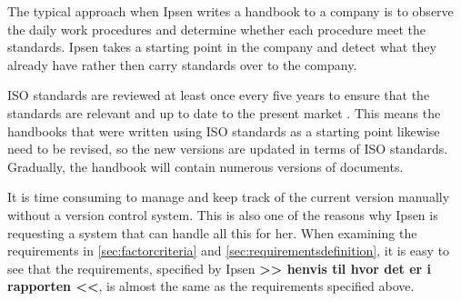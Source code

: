 The typical approach when Ipsen writes a handbook to a company is to observe the daily work procedures and determine whether each procedure meet the standards.
Ipsen takes a starting point in the company and detect what they already have rather then carry standards over to the company.


ISO standards are reviewed at least once every five years to ensure that the standards are relevant and up to date to the present market \cite{ISOreviewedevery5years}.
This means the handbooks that were written using ISO standards as a starting point likewise need to be revised, so the new versions are updated in terms of ISO standards.
Gradually, the handbook will contain numerous versions of documents.

It is time consuming to manage and keep track of the current version manually without a version control system.
This is also one of the reasons why Ipsen is requesting a system that can handle all this for her.
When examining the requirements in \cref{sec:factorcriteria} and \cref{sec:requirementsdefinition}, it is easy to see that the requirements, specified by Ipsen \textbf{>> henvis til hvor det er i rapporten <<}, is almost the same as the requirements specified above.
